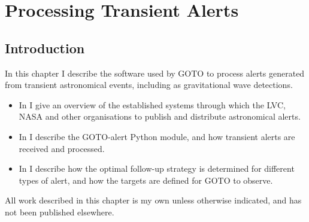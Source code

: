\chapter{Processing Transient Alerts}
\label{chap:alerts}
\chaptoc{}


\newpage
\section{Introduction}
\label{sec:alerts_intro}
\begin{colsection}

In this chapter I describe the software used by GOTO to process alerts generated from transient astronomical events, including as gravitational wave detections.
%
\begin{itemize}
    \item In  I give an overview of the established systems through which the LVC, NASA and other organisations to publish and distribute astronomical alerts.
    \item In  I describe the GOTO-alert Python module, and how transient alerts are received and processed.
    \item In  I describe how the optimal follow-up strategy is determined for different types of alert, and how the targets are defined for GOTO to observe.
\end{itemize}
%
All work described in this chapter is my own unless otherwise indicated, and has not been published elsewhere.

\end{colsection}


\newpage
